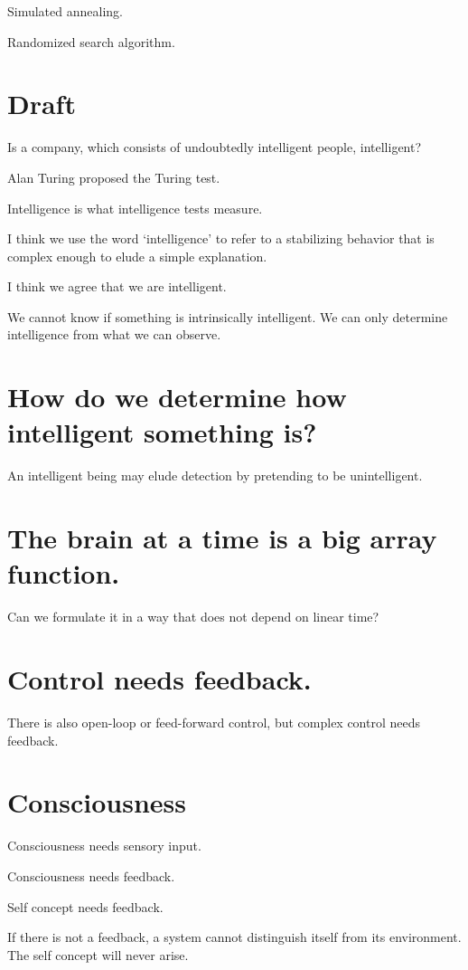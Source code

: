 Simulated annealing.

Randomized search algorithm.

\section{Draft}

Is a company, which consists of undoubtedly intelligent people, intelligent?

Alan Turing proposed the Turing test.

Intelligence is what intelligence tests measure.

I think we use the word `intelligence' to refer to a stabilizing behavior
that is complex enough to elude a simple explanation.

I think we agree that we are intelligent.

We cannot know if something is intrinsically intelligent.
We can only determine intelligence from what we can observe.

\section{How do we determine how intelligent something is?}

An intelligent being may elude detection by pretending to be unintelligent.

\section{The brain at a time is a big array function.}

Can we formulate it in a way that does not depend on linear time?

\section{Control needs feedback.}

There is also open-loop or feed-forward control,
but complex control needs feedback.

\section{Consciousness}

Consciousness needs sensory input.

Consciousness needs feedback.

Self concept needs feedback.

If there is not a feedback, a system cannot distinguish itself from its environment.
The self concept will never arise.

